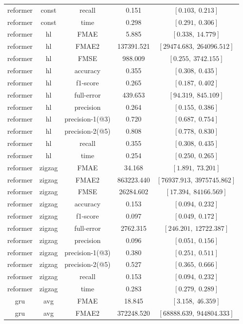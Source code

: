 \begin{center}
\begin{longtable}{|c|c|c|c|c|}
reformer & const & recall & 0.151 & $[0.103,\ 0.213]$ \\
reformer & const & time & 0.298 & $[0.291,\ 0.306]$ \\
\hline
reformer & hl & FMAE & 5.885 & $[0.338,\ 14.779]$ \\
reformer & hl & FMAE2 & 137391.521 & $[29474.683,\ 264096.512]$ \\
reformer & hl & FMSE & 988.009 & $[0.255,\ 3742.155]$ \\
reformer & hl & accuracy & 0.355 & $[0.308,\ 0.435]$ \\
reformer & hl & f1-score & 0.265 & $[0.187,\ 0.402]$ \\
reformer & hl & full-error & 439.653 & $[94.319,\ 845.109]$ \\
reformer & hl & precision & 0.264 & $[0.155,\ 0.386]$ \\
reformer & hl & precision-1(@3) & 0.720 & $[0.687,\ 0.754]$ \\
reformer & hl & precision-2(@5) & 0.808 & $[0.778,\ 0.830]$ \\
reformer & hl & recall & 0.355 & $[0.308,\ 0.435]$ \\
reformer & hl & time & 0.254 & $[0.250,\ 0.265]$ \\
\hline
reformer & zigzag & FMAE & 34.168 & $[1.891,\ 73.201]$ \\
reformer & zigzag & FMAE2 & 863223.440 & $[76937.913,\ 3975745.862]$ \\
reformer & zigzag & FMSE & 26284.602 & $[17.394,\ 84166.569]$ \\
reformer & zigzag & accuracy & 0.153 & $[0.094,\ 0.232]$ \\
reformer & zigzag & f1-score & 0.097 & $[0.049,\ 0.172]$ \\
reformer & zigzag & full-error & 2762.315 & $[246.201,\ 12722.387]$ \\
reformer & zigzag & precision & 0.096 & $[0.051,\ 0.156]$ \\
reformer & zigzag & precision-1(@3) & 0.380 & $[0.251,\ 0.511]$ \\
reformer & zigzag & precision-2(@5) & 0.527 & $[0.365,\ 0.666]$ \\
reformer & zigzag & recall & 0.153 & $[0.094,\ 0.232]$ \\
reformer & zigzag & time & 0.283 & $[0.279,\ 0.289]$ \\
\hline
gru & avg & FMAE & 18.845 & $[3.158,\ 46.359]$ \\
gru & avg & FMAE2 & 372248.520 & $[68888.639,\ 944804.333]$ \\

\end{longtable}
\end{center}
